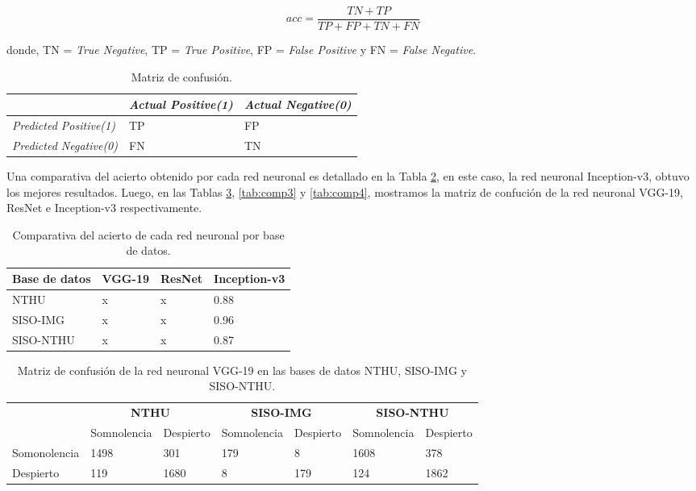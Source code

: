 \documentclass{article}
\begin{document}
	\begin{equation}\label{equ:acc}
		acc = \frac{TN + TP }{TP + FP + TN + FN}
	\end{equation}
	
	donde, TN = \textit{True Negative}, TP = \textit{True Positive}, FP = \textit{False Positive} y FN = \textit{False Negative}.
	
	\begin{table}[H]
		\centering		
		\caption{Matriz de confusión.}
		\label{tab:mat}
		\begin{tabular}{ p{4cm} p{3cm} p{3cm} }
			\hline 		
			& \textit{Actual Positive(1)} & \textit{Actual Negative(0)} \\
			\hline 
			\textit{Predicted Positive(1)} & TP & FP \\
			\textit{Predicted Negative(0)} & FN & TN \\
			\hline  
		\end{tabular}
	\end{table}
	

	Una comparativa del acierto obtenido por cada red neuronal es detallado en la Tabla \ref{tab:comp1}, en este caso, la red neuronal Inception-v3, obtuvo los mejores resultados. Luego, en las Tablas \ref{tab:comp2}, \ref{tab:comp3} y \ref{tab:comp4}, mostramos la matriz de confución de la red neuronal VGG-19, ResNet e Inception-v3 respectivamente.

	\begin{table}[H]
		\centering		
		\caption{Comparativa del acierto de cada red neuronal por base de datos.}
		\label{tab:comp1}
		\begin{tabular}{ p{3cm} p{3cm} p{3cm} p{3cm}}
			\hline 
			\textbf{Base de datos} & \textbf{VGG-19} & \textbf{ResNet} & \textbf{Inception-v3}   \\
			\hline 
			NTHU & x & x & 0.88 \\
			SISO-IMG & x & x & 0.96 \\			
			SISO-NTHU & x & x & 0.87 \\
			\hline 
		\end{tabular}
	\end{table}

	\begin{table}[H]
		\centering		
		\caption{Matriz de confusión de la red neuronal VGG-19 en las bases de datos NTHU, SISO-IMG y SISO-NTHU.}
		\label{tab:comp2}
		\begin{tabular}{ p{1.9cm} p{2cm} p{1.6cm} p{1.9cm} p{1.6cm} p{1.9cm} p{1.6cm}}
			\hline 
			& \multicolumn{2}{c}{\textbf{NTHU}} & \multicolumn{2}{c}{\textbf{SISO-IMG}} &  \multicolumn{2}{c}{\textbf{SISO-NTHU}} \\
			& Somnolencia & Despierto & Somnolencia & Despierto & Somnolencia & Despierto  \\
			\hline 
			Somonolencia & 1498 & 301 		& 179 & 8 		& 1608 & 378 \\
			Despierto & 119 & 1680 	& 8 & 179  	    & 124 & 1862	\\	
			\hline 
		\end{tabular}
	\end{table}
\end{document}
